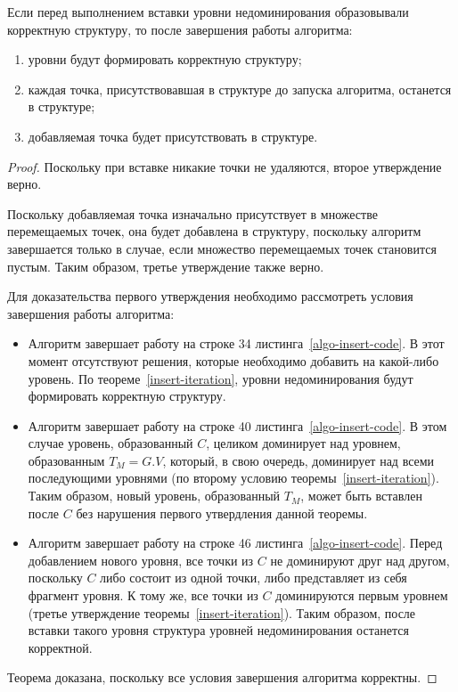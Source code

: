 \begin{theorem}
Если перед выполнением вставки уровни недоминирования образовывали корректную структуру, то 
после завершения работы алгоритма:
\begin{enumerate}
    \item уровни будут формировать корректную структуру;
    \item каждая точка, присутствовавшая в структуре до запуска алгоритма,
	      останется в структуре;
    \item добавляемая точка будет присутствовать в структуре.
\end{enumerate}
\end{theorem}
\begin{proof}
Поскольку при вставке никакие точки не удаляются, второе утверждение верно.

Поскольку добавляемая точка изначально присутствует в множестве перемещаемых точек, она будет 
добавлена в структуру, поскольку алгоритм завершается только в случае, если множество перемещаемых 
точек становится пустым. Таким образом, третье утверждение также верно.

Для доказательства первого утверждения необходимо рассмотреть условия завершения работы алгоритма:
\begin{itemize}
    \item Алгоритм завершает работу на строке 34 листинга~\ref{algo-insert-code}.
          В этот момент отсутствуют решения, которые необходимо добавить на какой-либо уровень.
          По теореме~\ref{insert-iteration}, уровни недоминирования будут формировать корректную
		  структуру.
    \item Алгоритм завершает работу на строке 40 листинга~\ref{algo-insert-code}.
          В этом случае уровень, образованный $C$, целиком доминирует над уровнем, 
		  образованным $T_M = G.V$, который, в свою очередь, доминирует над всеми последующими уровнями
		  (по второму условию теоремы~\ref{insert-iteration}).
		  Таким образом, новый уровень, образованный $T_M$, может быть вставлен после $C$ 
		  без нарушения первого утвердления данной теоремы.
    \item Алгоритм завершает работу на строке 46 листинга~\ref{algo-insert-code}. Перед добавлением
		  нового уровня, все точки из $C$ не доминируют друг над другом, поскольку $C$ либо
          состоит из одной точки, либо представляет из себя фрагмент уровня. К тому же, все точки из $C$
		  доминируются первым уровнем (третье утверждение теоремы~\ref{insert-iteration}).
		  Таким образом, после вставки такого уровня структура уровней недоминирования останется
		  корректной.
\end{itemize}
Теорема доказана, поскольку все условия завершения алгоритма корректны.
\end{proof}

